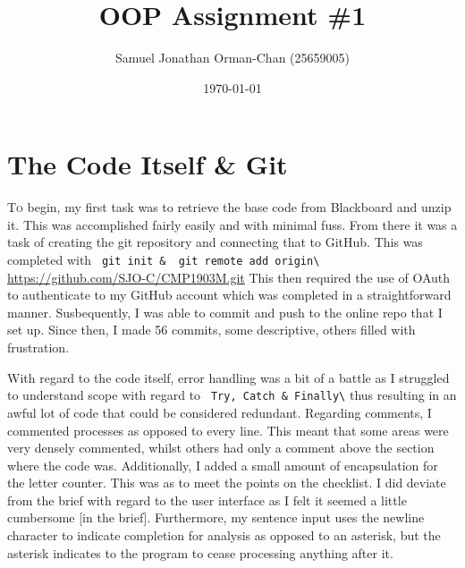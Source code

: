 \documentclass[11pt]{article} %
\title{OOP Assignment \#1}
\author{Samuel Jonathan Orman-Chan (25659005)}
\date{\today} %
\begin{document}
\maketitle
\section{The Code Itself \& Git}
\lettrine{T}{o} begin, my first task was to retrieve the base code from Blackboard and unzip it. This was accomplished fairly easily and with minimal fuss. From there it was a task of creating the git repository and connecting that to GitHub. This was completed with \Verb+ git init &  git remote add origin\+ \url{https://github.com/SJO-C/CMP1903M.git} This then required the use of OAuth to authenticate to my GitHub account which was completed in a straightforward manner. Susbequently, I was able to commit and push to the online repo that I set up. Since then, I made 56 commits, some descriptive, others filled with frustration. \par
With regard to the code itself, error handling was a bit of a battle as I struggled to understand scope with regard to \Verb+ Try, Catch & Finally\+ thus resulting in an awful lot of code that could be considered redundant. Regarding comments, I commented processes as opposed to every line. This meant that some areas were very densely commented, whilst others had only a comment above the section where the code was. Additionally, I added a small amount of encapsulation for the letter counter. This was as to meet the points on the checklist. I did deviate from the brief with regard to the user interface as I felt it seemed a little cumbersome [in the brief]. Furthermore, my sentence input  uses the newline character to indicate completion for analysis as opposed to an asterisk, but the asterisk indicates to the program to cease processing anything after it.
\end{document}

